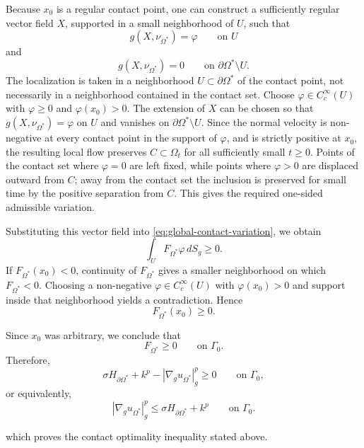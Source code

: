 \documentclass{article}
\renewcommand{\boxed}[1]{#1}
\begin{document}
Because $x_0$ is a regular contact point, one can construct a
sufficiently regular vector field $X$, supported in a small
neighborhood of $U$, such that
\[
g(X,\nu_{\Omega^\ast})=\varphi
\qquad\text{on }U
\]
and
\[
g(X,\nu_{\Omega^\ast})=0
\qquad\text{on }\partial\Omega^\ast\setminus U.
\]
The localization is taken in a neighborhood $U\subset\partial\Omega^\ast$
of the contact point, not necessarily in a neighborhood contained in the
contact set. Choose $\varphi\in C_c^\infty(U)$ with $\varphi\geq0$ and
$\varphi(x_0)>0$. The extension of $X$ can be chosen so that
$g(X,\nu_{\Omega^\ast})=\varphi$ on $U$ and vanishes on
$\partial\Omega^\ast\setminus U$. Since the normal velocity is
non-negative at every contact point in the support of $\varphi$, and is
strictly positive at $x_0$, the resulting local flow preserves
$C\subset\Omega_t$ for all sufficiently small $t\geq0$. Points of the
contact set where $\varphi=0$ are left fixed, while points where
$\varphi>0$ are displaced outward from $C$; away from the contact set the
inclusion is preserved for small time by the positive separation from
$C$. This gives the required one-sided admissible variation.

Substituting this vector field into
\eqref{eq:global-contact-variation}, we obtain
\[
\int_U F_{\Omega^\ast}\varphi\,dS_g\geq0.
\]
If $F_{\Omega^\ast}(x_0)<0$, continuity of $F_{\Omega^\ast}$ gives a
smaller neighborhood on which $F_{\Omega^\ast}<0$. Choosing a
non-negative $\varphi\in C_c^\infty(U)$ with $\varphi(x_0)>0$ and support
inside that neighborhood yields a contradiction. Hence
\[
F_{\Omega^\ast}(x_0)\geq0.
\]

Since $x_0$ was arbitrary, we conclude that
\[
F_{\Omega^\ast}\geq0
\qquad\text{on }\Gamma_0.
\]
Therefore,
\[
\sigma H_{\partial\Omega^\ast}
+k^p
-
|\nabla_g u_{\Omega^\ast}|_g^p
\geq0
\qquad\text{on }\Gamma_0,
\]
or equivalently,
\[
\boxed{
|\nabla_g u_{\Omega^\ast}|_g^p
\leq
\sigma H_{\partial\Omega^\ast}
+k^p
\qquad\text{on }\Gamma_0.
}
\]

which proves the contact optimality inequality stated above.
\end{document}
